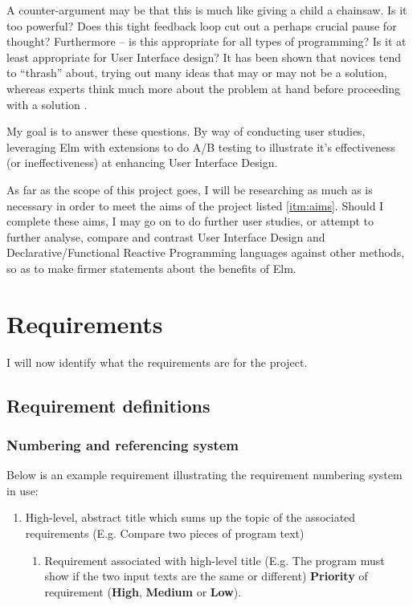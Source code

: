 \documentclass[11pt,openright,a4paper]{report}
\begin{document}
A counter-argument may be that this is much like giving a
child a chainsaw. Is it too powerful? Does this tight feedback loop cut out a
perhaps crucial pause for
thought? Furthermore -- is this appropriate for all types of programming? Is it
at least appropriate for User Interface design? It has been shown that novices
tend to ``thrash'' about, trying out many ideas that may or may not be a
solution,
whereas experts think much more about the problem at hand before proceeding with
a solution \cite{Lopez2012a}.

My goal is to answer these questions. By way of conducting user studies, 
leveraging Elm with extensions to do A/B testing to illustrate it's
effectiveness (or ineffectiveness) at enhancing User Interface Design. 

As far as the scope of this project goes, I will be researching as much as
is necessary in order to meet the aims of the project listed \ref{itm:aims}.
Should I complete these aims, I may go on to do further user studies, or attempt
to further analyse, compare and contrast User Interface Design and
Declarative/Functional Reactive Programming languages against other methods, so
as to make firmer statements about the benefits of Elm.

\chapter{Requirements}

I will now identify what the requirements are for the project.

\section{Requirement definitions}
\subsection{Numbering and referencing system}
Below is an example requirement illustrating the requirement numbering system
in use:
\begin{enumerate}
  \item High-level, abstract title which sums up the topic of the associated 
  requirements (E.g. Compare two pieces of program text)
  \label{itm:example}
    \begin{enumerate}
      \item Requirement associated with high-level title (E.g. The program must show if
	the two input texts are the same or different)
      \label{itm:example-requirement}
	\textbf{Priority} of requirement (\textbf{High}, \textbf{Medium} or
	\textbf{Low}).
    \end{enumerate}
\end{enumerate}
\end{document}
